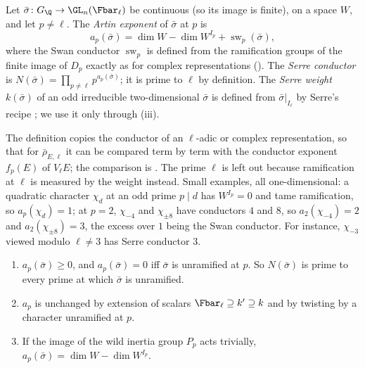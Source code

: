 \begin{definition}\label{def:galrep:serre-conductor}
Let $\bar\sigma\colon G_\Q\to\GL_n(\Fbar_\ell)$ be continuous (so its image is finite), on a space $W$, and let $p\ne\ell$. The \emph{Artin exponent} of $\bar\sigma$ at $p$ is
\[
a_p(\bar\sigma)=\dim W-\dim W^{I_p}+\operatorname{sw}_p(\bar\sigma),
\]
where the Swan conductor $\operatorname{sw}_p$ is defined from the ramification groups of the finite image of $D_p$ exactly as for complex
representations (). The \emph{Serre conductor} is $N(\bar\sigma)=\prod_{p\ne\ell}p^{a_p(\bar\sigma)}$; it is prime to $\ell$ by definition. The
\emph{Serre weight} $k(\bar\sigma)$ of an odd irreducible two-dimensional $\bar\sigma$ is defined from $\bar\sigma|_{I_\ell}$ by Serre's recipe \cite[Section 2]{Serre87};
we use it only through (iii).
\end{definition}

The definition copies the conductor of an $\ell$-adic or complex representation, so that for $\bar\rho_{E,\ell}$ it can be compared term by term with the conductor
exponent $f_p(E)$ of $V_\ell E$; the comparison is . The prime $\ell$ is left out because ramification at $\ell$ is measured by
the weight instead. Small examples, all one-dimensional: a quadratic character $\chi_d$ at an odd prime $p\mid d$ has $W^{I_p}=0$ and tame ramification, so
$a_p(\chi_d)=1$; at $p=2$, $\chi_{-4}$ and $\chi_{\pm8}$ have conductors $4$ and $8$, so $a_2(\chi_{-4})=2$ and $a_2(\chi_{\pm8})=3$, the excess over $1$ being the Swan conductor.
For instance, $\chi_{-3}$ viewed modulo $\ell\ne3$ has Serre conductor $3$.

\begin{proposition}\label{prop:galrep:serre-conductor-basic}
\begin{enumerate}[label=(\roman*)]
\item $a_p(\bar\sigma)\ge0$, and $a_p(\bar\sigma)=0$ iff $\bar\sigma$ is unramified at $p$. So $N(\bar\sigma)$ is prime to every prime at which $\bar\sigma$ is unramified.
\item $a_p$ is unchanged by extension of scalars $\Fbar_\ell\supseteq k'\supseteq k$ and by twisting by a character unramified at $p$.
\item If the image of the wild inertia group $P_p$ acts trivially, $a_p(\bar\sigma)=\dim W-\dim W^{I_p}$.
\end{enumerate}
\end{proposition}

